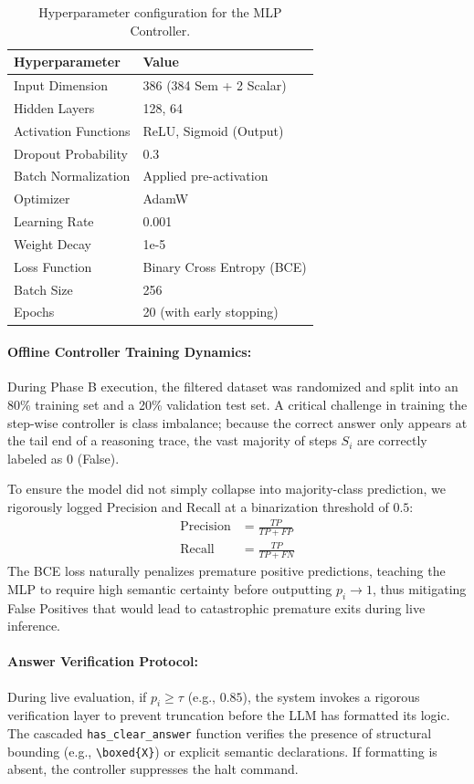 \documentclass[11pt]{article}
\begin{document}
\begin{table}[h!]
\centering
\small
\begin{tabular}{@{}ll@{}}
\toprule
\textbf{Hyperparameter} & \textbf{Value} \\ \midrule
Input Dimension & 386 (384 Sem + 2 Scalar) \\
Hidden Layers & 128, 64 \\
Activation Functions & ReLU, Sigmoid (Output) \\
Dropout Probability & 0.3 \\
Batch Normalization & Applied pre-activation \\
Optimizer & AdamW \\
Learning Rate & 0.001 \\
Weight Decay & 1e-5 \\
Loss Function & Binary Cross Entropy (BCE) \\
Batch Size & 256 \\
Epochs & 20 (with early stopping) \\ \bottomrule
\end{tabular}
\caption{Hyperparameter configuration for the MLP Controller.}
\label{tab:hyperparams}
\end{table}

\paragraph{Offline Controller Training Dynamics:}
During Phase B execution, the filtered dataset was randomized and split into an 80\% training set and a 20\% validation test set. A critical challenge in training the step-wise controller is class imbalance; because the correct answer only appears at the tail end of a reasoning trace, the vast majority of steps $S_i$ are correctly labeled as $0$ (False). 

To ensure the model did not simply collapse into majority-class prediction, we rigorously logged Precision and Recall at a binarization threshold of $0.5$:
\begin{align}
    \text{Precision} &= \frac{TP}{TP + FP} \\
    \text{Recall} &= \frac{TP}{TP + FN}
\end{align}
The BCE loss naturally penalizes premature positive predictions, teaching the MLP to require high semantic certainty before outputting $p_i \to 1$, thus mitigating False Positives that would lead to catastrophic premature exits during live inference.

\paragraph{Answer Verification Protocol:} During live evaluation, if $p_i \geq \tau$ (e.g., $0.85$), the system invokes a rigorous verification layer to prevent truncation before the LLM has formatted its logic. The cascaded \texttt{has\_clear\_answer} function verifies the presence of structural bounding (e.g., \verb|\boxed{X}|) or explicit semantic declarations. If formatting is absent, the controller suppresses the halt command.
\end{document}
